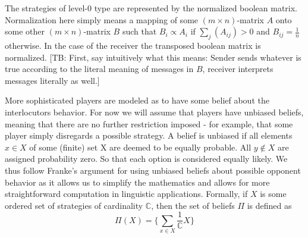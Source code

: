 \documentclass[10pt]{article}
\newcommand{\tb}[1]{\textcolor[rgb]{.8,.33,.0}{[TB: #1]}}%
\begin{document}
The strategies of level-0 type are represented by the normalized boolean matrix. Normalization here simply means a mapping of some $(m\times n)$-matrix $A$ onto some other $(m\times n)$-matrix $B$ such that $B_i\propto A_i$ if $\sum_j (A_{ij})>0$ and $B_{ij}=\tfrac{1}{n}$ otherwise. In the case of the receiver the transposed boolean matrix is normalized. \tb{First, say intuitively what this means: Sender sends whatever is true according to the literal meaning of messages in $B$, receiver interprets messages literally as well.}

More sophisticated players are modeled as to have some belief about the interlocutors behavior. For now we will assume that players have unbiased beliefs, meaning that there are no further restriction imposed - for example, that some player simply disregards a possible strategy. A belief is unbiased if all elements $x\in X$ of some (finite) set X are deemed to be equally probable. All $y\not\in X$ are assigned probability zero. So that each option is considered equally likely. We thus follow Franke's argument for
 using unbiased beliefs about possible opponent behavior as it allows us to simplify the mathematics and allows for more straightforward computation in linguistic applications. Formally, if $X$ is some ordered set of strategies of cardinality $\mathbb{C}$, then the set of beliefs $\Pi$ is defined as\\
\begin{equation*}
\Pi(X)=\{\sum_{x\in X} \dfrac{1}{\mathbb{C}}X\}
\end{equation*} %

\end{document}
